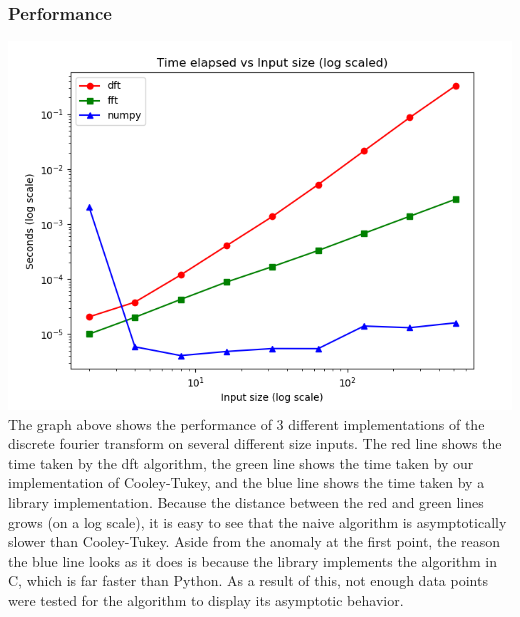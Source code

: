 	\subsubsection{Performance}
		\includegraphics[width=\linewidth]{images/perfGraph.png}
		The graph above shows the performance of 3 different implementations of the discrete fourier transform on several different size inputs. The red line shows the time taken by the dft algorithm, the green line shows the time taken by our implementation of Cooley-Tukey, and the blue line shows the time taken by a library implementation. Because the distance between the red and green lines grows (on a log scale), it is easy to see that the naive algorithm is asymptotically slower than Cooley-Tukey. Aside from the anomaly at the first point, the reason the blue line looks as it does is because the library implements the algorithm in C, which is far faster than Python. As a result of this, not enough data points were tested for the algorithm to display its asymptotic behavior.
